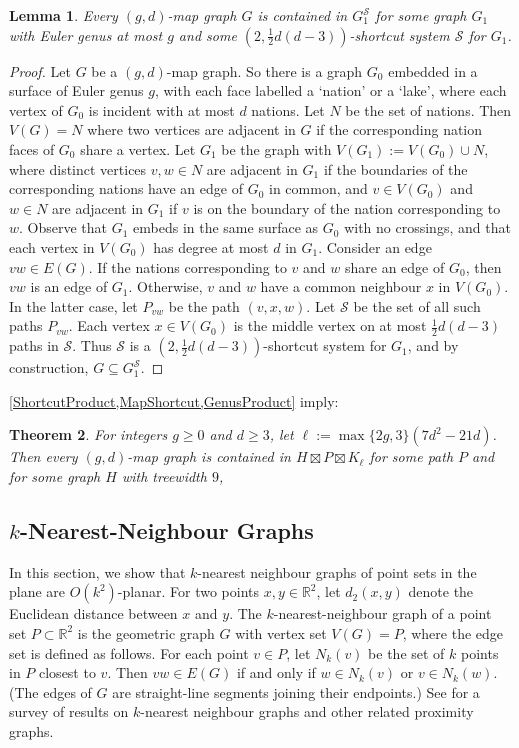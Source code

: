 \documentclass{patmorin}
\theoremstyle{plain}
\newtheorem{thm}{Theorem}
\newtheorem{lem}[thm]{Lemma}
\theoremstyle{definition}
\renewcommand{\SS}{\mathcal{S}}
\renewcommand{\geq}{\geqslant}
\newcommand{\R}{\mathbb{R}}
\begin{document}
\begin{lem}
\label{MapShortcut}
Every $(g,d)$-map graph $G$ is contained in $G_1^\SS$ for some graph $G_1$ with Euler genus at most $g$ and some $(2,\tfrac12 d(d-3) )$-shortcut system $\SS$ for $G_1$.
\end{lem}

\begin{proof}
Let $G$ be a $(g,d)$-map graph. So there is a graph $G_0$ embedded in a surface of Euler genus $g$, with each face labelled a `nation' or a `lake', where each vertex of $G_0$ is incident with at most $d$ nations. Let $N$ be the set of nations. Then $V(G)=N$ where two vertices are adjacent in $G$ if the corresponding nation faces of $G_0$ share a vertex. Let $G_1$ be the graph with $V(G_1):=V(G_0) \cup N$, where distinct vertices $v,w\in N$ are adjacent in $G_1$ if the boundaries of the corresponding nations have an edge of $G_0$ in common, and $v\in V(G_0)$ and $w\in N$ are adjacent in $G_1$ if $v$ is on the boundary of the nation corresponding to $w$. Observe that $G_1$ embeds in the same surface as $G_0$ with no crossings, and that each vertex in $V(G_0)$ has degree at most $d$ in $G_1$. Consider an edge $vw\in E(G)$. If the nations corresponding to $v$ and $w$ share an edge of $G_0$, then $vw$ is an edge of $G_1$. Otherwise,  $v$ and $w$ have a common neighbour $x$ in $V(G_0)$. In the latter case, let $P_{vw}$ be the path $(v,x,w)$. Let $\SS$ be the set of all such paths $P_{vw}$. Each vertex $x\in V(G_0)$ is the middle vertex on at most $\tfrac12 d(d-3)$  paths in $\SS$. Thus $\SS$ is a $(2,\tfrac12 d(d-3))$-shortcut system for $G_1$, and by construction, $G \subseteq G_1^\SS$.
\end{proof}


\cref{ShortcutProduct,MapShortcut,GenusProduct} imply:

\begin{thm}
\label{gdMapProduct}
For integers $g\geq 0$ and $d\geq 3$, let $\ell:= \max\{2g,3\}(7d^2-21d)$.
Then every $(g,d)$-map graph is contained in $H\boxtimes P \boxtimes K_{\ell}$ for some path $P$ and for some graph $H$ with treewidth $9$,
\end{thm}


\subsection{$k$-Nearest-Neighbour Graphs}
\label{last_example}

In this section, we show that $k$-nearest neighbour graphs of point sets in the plane are $O(k^2)$-planar.  For two points $x,y\in\R^2$, let $d_2(x,y)$ denote the Euclidean distance between $x$ and $y$. The $k$-nearest-neighbour graph of a point set $P\subset\R^2$ is the geometric graph $G$ with vertex set $V(G)=P$, where the edge set is defined as follows. For each point $v\in P$, let $N_k(v)$ be the set of $k$ points in $P$ closest to $v$. Then $vw\in E(G)$ if and only if $w\in N_k(v)$ or $v\in N_k(w)$. (The edges of $G$ are straight-line segments joining their endpoints.) See \citep{ProximityGraphs} for a survey of results on $k$-nearest neighbour graphs and other related proximity graphs.
\end{document}

